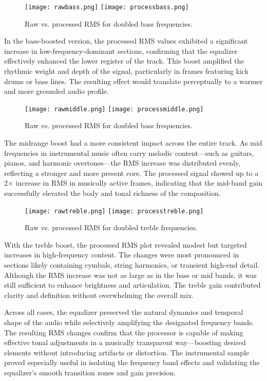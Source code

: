 \documentclass[conference]{IEEEtran}
\begin{document}
\begin{figure}[htbp]
    \centering
    \texttt{[image: rawbass.png]}
    \texttt{[image: processbass.png]}
    \caption{Raw vs. processed RMS for doubled bass frequencies.}
    \label{fig:figure4}
\end{figure}

In the bass-boosted version, the processed RMS values exhibited a significant increase in low-frequency-dominant sections, confirming that the equalizer effectively enhanced the lower register of the track. This boost amplified the rhythmic weight and depth of the signal, particularly in frames featuring kick drums or bass lines. The resulting effect would translate perceptually to a warmer and more grounded audio profile.

\begin{figure}[H]
    \centering
    \texttt{[image: rawmiddle.png]}
    \texttt{[image: processmiddle.png]}
    \caption{Raw vs. processed RMS for doubled bass frequencies.}
    \label{fig:figure5}
\end{figure}

The midrange boost had a more consistent impact across the entire track. As mid frequencies in instrumental music often carry melodic content—such as guitars, pianos, and harmonic overtones—the RMS increase was distributed evenly, reflecting a stronger and more present core. The processed signal showed up to a 2× increase in RMS in musically active frames, indicating that the mid-band gain successfully elevated the body and tonal richness of the composition.

\begin{figure}[!ht]
    \centering
    \texttt{[image: rawtreble.png]}
    \texttt{[image: processtreble.png]}
    \caption{Raw vs. processed RMS for doubled treble frequencies.}
    \label{fig:figure6}
\end{figure}

With the treble boost, the processed RMS plot revealed modest but targeted increases in high-frequency content. The changes were most pronounced in sections likely containing cymbals, string harmonics, or transient high-end detail. Although the RMS increase was not as large as in the bass or mid bands, it was still sufficient to enhance brightness and articulation. The treble gain contributed clarity and definition without overwhelming the overall mix.

Across all cases, the equalizer preserved the natural dynamics and temporal shape of the audio while selectively amplifying the designated frequency bands. The resulting RMS changes confirm that the processor is capable of making effective tonal adjustments in a musically transparent way—boosting desired elements without introducing artifacts or distortion. The instrumental sample proved especially useful in isolating the frequency band effects and validating the equalizer’s smooth transition zones and gain precision.
\end{document}
